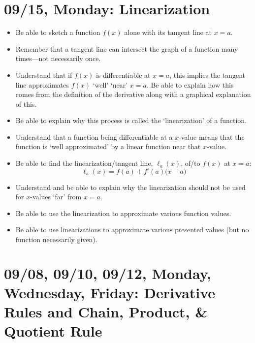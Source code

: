 \documentclass[11pt,letterpaper]{article}
\begin{document}
\newpage
\section*{09/15, Monday: Linearization\label{09-15}}

\begin{itemize}
\item Be able to sketch a function $f(x)$ alone with its tangent line at $x= a$.
\item Remember that a tangent line can intersect the graph of a function many times---not necessarily once.
\item Understand that if $f(x)$ is differentiable at $x= a$, this implies the tangent line approximates $f(x)$ `well' `near' $x= a$. Be able to explain how this comes from the definition of the derivative along with a graphical explanation of this. 
\item Be able to explain why this process is called the `linearization' of a function. 
\item Understand that a function being differentiable at a $x$-value means that the function is `well approximated' by a linear function near that $x$-value.
\item Be able to find the linearization/tangent line, $\ell_a(x)$, of/to $f(x)$ at $x= a$:
	\[
	\ell_a(x)= f(a) + f'(a) \big( x - a \big)
	\]
\item Understand and be able to explain why the linearization should not be used for $x$-values `far' from $x= a$.
\item Be able to use the linearization to approximate various function values. 
\item Be able to use linearizations to approximate various presented values (but no function necessarily given).
\end{itemize}

\newpage
\section*{09/08, 09/10, 09/12, Monday, Wednesday, Friday: Derivative Rules and Chain, Product, \& Quotient Rule\label{09-08--09-12}}
\end{document}
